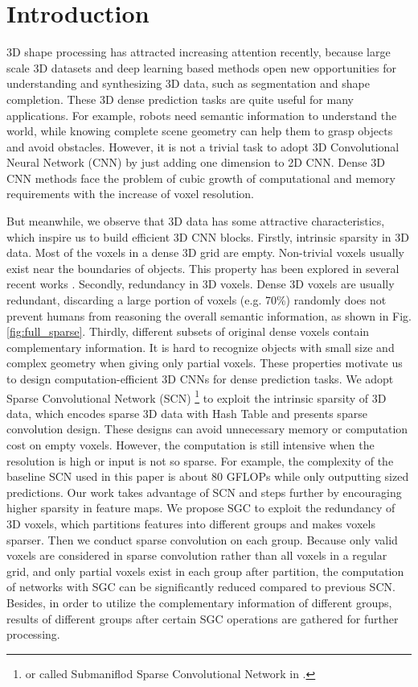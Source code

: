 \documentclass[runningheads]{llncs}
\begin{document}
\section{Introduction}
\label{sec::intro}
3D shape processing has attracted increasing attention recently, because large scale 3D datasets and deep learning based methods open new opportunities for understanding and synthesizing 3D data, such as segmentation and shape completion.
These 3D dense prediction tasks are quite useful for many applications. For example, robots need semantic information to understand the world, while knowing complete scene geometry can help them to grasp objects \cite{2016arXiv160908546V} and avoid obstacles.
However, it is not a trivial task to adopt 3D Convolutional Neural Network (CNN) by just adding one dimension to 2D CNN. Dense 3D CNN methods \cite{Wu2015,Maturana2015} face the problem of cubic growth of computational and memory requirements with the increase of voxel resolution.


But meanwhile, we observe that 3D data has some attractive characteristics, which inspire us to build efficient 3D CNN blocks. Firstly, intrinsic sparsity in 3D data. Most of the voxels in a dense 3D grid are empty. Non-trivial voxels usually exist near the boundaries of objects. This property has been explored in several recent works \cite{Riegler2016,wang2017cnn,Graham2015,2017arXiv170601307G}.
Secondly, redundancy in 3D voxels. Dense 3D voxels are usually redundant, discarding a large portion of voxels (e.g. 70\%) randomly does not prevent humans from reasoning the overall semantic information, as shown in Fig. \ref{fig:full_sparse}.
Thirdly, different subsets of original dense voxels contain complementary information. It is hard to recognize objects with small size and complex geometry when giving only partial voxels.
These properties motivate us to design computation-efficient 3D CNNs for dense prediction tasks.
We adopt Sparse Convolutional Network (SCN) \cite{2017arXiv170601307G}\footnote{or called Submaniflod Sparse Convolutional Network in \cite{2017arXiv170601307G}.} to exploit the intrinsic sparsity of 3D data, which encodes sparse 3D data with Hash Table and presents sparse convolution design. These designs can avoid unnecessary memory or computation cost on empty voxels.
However, the computation is still intensive when the resolution is high or input is not so sparse.
For example, the complexity of the baseline SCN used in this paper is about 80 GFLOPs while only outputting  sized predictions.
Our work takes advantage of SCN and steps further by encouraging higher sparsity in feature maps.
We propose SGC to exploit the redundancy of 3D voxels, which partitions features into different groups and makes voxels sparser. Then we conduct sparse convolution on each group.
Because only valid voxels are considered in sparse convolution rather than all voxels in a regular grid, and only partial voxels exist in each group after partition, the computation of networks with SGC can be significantly reduced compared to previous SCN.
Besides, in order to utilize the complementary information of different groups, results of different groups after certain SGC operations are gathered for further processing.
\end{document}
